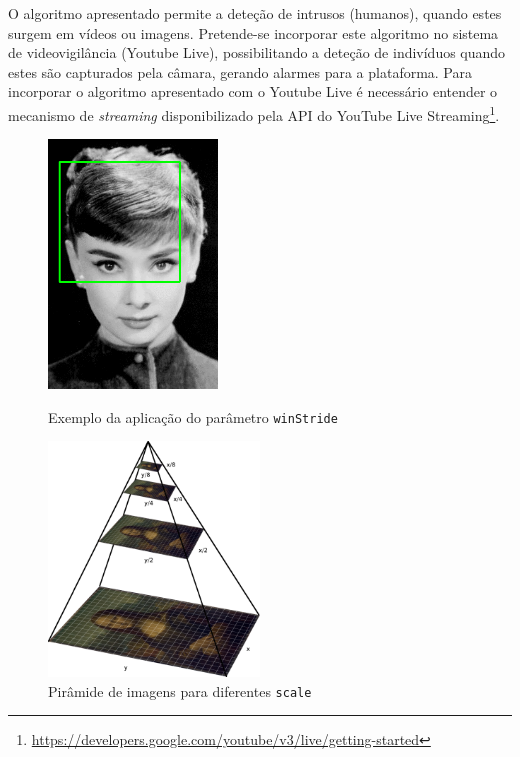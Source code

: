 O algoritmo apresentado permite a deteção de intrusos (humanos), quando estes surgem em vídeos ou imagens. Pretende-se incorporar este algoritmo no sistema de videovigilância (Youtube Live), possibilitando a deteção de indivíduos quando estes são capturados pela câmara, gerando alarmes para a plataforma. Para incorporar o algoritmo apresentado com o Youtube Live é necessário entender o mecanismo de \textit{streaming} disponibilizado pela \ac{API} do YouTube Live Streaming\footnote{\url{https://developers.google.com/youtube/v3/live/getting-started}}.  

\newpage

\begin{figure}[h]
	\centering
	\begin{minipage}[b]{0.49\textwidth}
		\centering
		\includegraphics[width=0.4\textwidth]{img/sliding_window_example-11.png}
		\caption{Exemplo da aplicação do parâmetro \texttt{winStride} }
		\label{winStride}
	\end{minipage}
	\hfill
	\begin{minipage}[b]{0.49\textwidth}
		\centering
		\includegraphics[width=0.5\textwidth]{img/pyramid.png}
		\caption{Pirâmide de imagens para diferentes \texttt{scale}}
		\label{scale}
	\end{minipage}
	
\end{figure}

